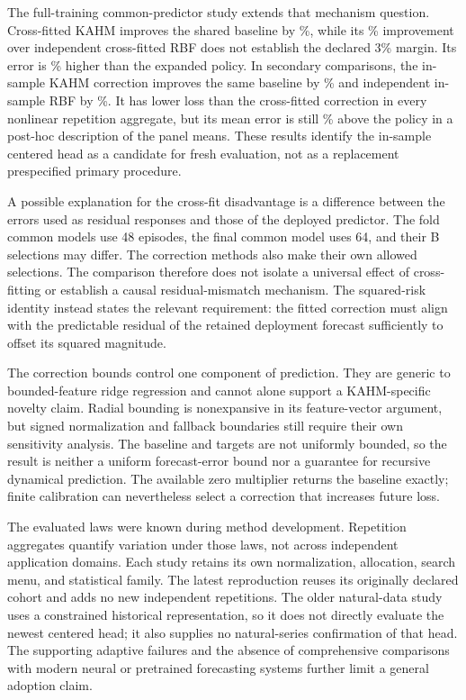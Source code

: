 The full-training common-predictor study extends that mechanism question.
Cross-fitted KAHM improves the shared baseline by \CFRGainBias\%, while
its \CFRGainRBF\% improvement over independent cross-fitted RBF does
not establish the declared 3\% margin. Its error is
\CFRPolicyPenalty\% higher than the expanded policy. In secondary
comparisons, the in-sample KAHM correction improves the same baseline
by \CFRISGainBias\% and independent in-sample RBF by \CFRISGainRBF\%.
It has lower loss than the cross-fitted correction in every nonlinear repetition
aggregate, but its mean error is still \CFRISPolicyPenalty\% above the
policy in a post-hoc description of the panel means. These results
identify the in-sample centered head as a candidate for fresh evaluation,
not as a replacement prespecified primary procedure.

A possible explanation for the cross-fit disadvantage is a difference
between the errors used as residual responses and those of the deployed
predictor. The fold common models use 48 episodes, the final common
model uses 64, and their B selections may differ. The correction methods
also make their own allowed selections. The comparison therefore does
not isolate a universal effect of cross-fitting or establish a causal
residual-mismatch mechanism. The squared-risk identity instead states
the relevant requirement: the fitted correction must align with the
predictable residual of the retained deployment forecast sufficiently
to offset its squared magnitude.

The correction bounds control one component of prediction. They are
generic to bounded-feature ridge regression and cannot alone support a
KAHM-specific novelty claim. Radial bounding is nonexpansive in its
feature-vector argument, but signed normalization and fallback
boundaries still require their own sensitivity analysis. The baseline
and targets are not uniformly bounded, so the result is neither a
uniform forecast-error bound nor a guarantee for recursive dynamical
prediction. The available zero multiplier returns the baseline exactly;
finite calibration can nevertheless select a correction that increases
future loss.

The evaluated laws were known during method development. Repetition
aggregates quantify variation under those laws, not across independent
application domains. Each study retains its own normalization,
allocation, search menu, and statistical family. The latest reproduction
reuses its originally declared cohort and adds no new independent
repetitions. The older natural-data study uses a constrained historical
representation, so it does not directly evaluate the newest centered
head; it also supplies no natural-series confirmation of that head.
The supporting adaptive failures and the absence of comprehensive
comparisons with modern neural or pretrained forecasting systems further
limit a general adoption claim.

